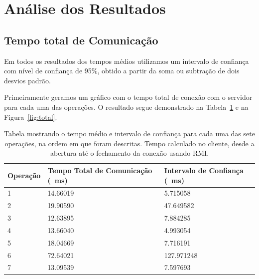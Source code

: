 \documentclass[12pt,a4paper]{article}
\begin{document}
\section{Análise dos Resultados}

\subsection{Tempo total de Comunicação}

Em todos os resultados dos tempos médios utilizamos um intervalo de confiança com nível de confiança de 95\%, obtido a partir da soma ou subtração de dois desvios padrão.
    
Primeiramente geramos um gráfico com o tempo total de conexão com o servidor para cada uma das operações. O resultado segue demonstrado na Tabela~\ref{table:total} e na Figura~\ref{fig:total}.

\begin{table}[h]
\centering
\caption{Tabela mostrando o tempo médio e intervalo de confiança para cada uma das sete operações, na ordem em que foram descritas. Tempo calculado no cliente, desde a abertura até o fechamento da conexão usando RMI.}
\label{table:total}
\begin{tabular}{lll}
Operação & Tempo Total de Comunicação (\SI{}{\milli\second}) & Intervalo de Confiança (\SI{}{\milli\second}) \\ \hline
1        & 14.66019          & 5.715058      \\
2        & 19.90590          & 47.649582  	 \\
3        & 12.63895          & 7.884285  	 \\
4        & 13.66040          & 4.993054   	 \\
5        & 18.04669          & 7.716191   	  \\
6        & 72.64021          & 127.971248 	 \\
7        & 13.09539          & 7.597693   	
\end{tabular}
\end{table}
\end{document}
